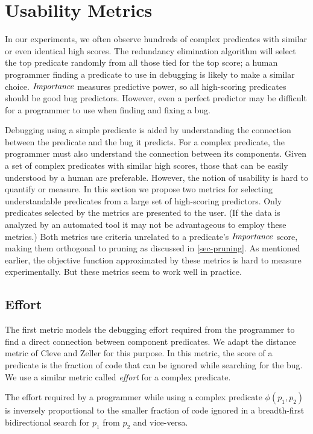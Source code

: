 
\section{Usability Metrics}
\label{sec-metrics}
In our experiments, we often observe hundreds of complex predicates with similar or even identical high scores.  The redundancy elimination algorithm will select the top predicate randomly from all those tied for the top score; a human programmer finding a predicate to use in debugging is likely to make a similar choice.  $\mathit{Importance}$ measures predictive power, so all high-scoring predicates should be good bug predictors.  However, even a perfect predictor may be difficult for a programmer to use when finding and fixing a bug.

Debugging using a simple predicate is aided by understanding the connection between the predicate and the bug it predicts.  For a complex predicate, the programmer must also understand the connection between its components.  Given a set of complex predicates with similar high scores, those that can be easily understood by a human are preferable.  However, the notion of usability is hard to quantify or measure.  In this section we propose two metrics for selecting understandable predicates from a large set of high-scoring predictors.  Only predicates selected by the metrics are presented to the user.  (If the data is analyzed by an automated tool it may not be advantageous to employ these metrics.)  Both metrics use criteria unrelated to a predicate's $\mathit{Importance}$ score, making them orthogonal to pruning as discussed in \autoref{sec-pruning}.  As mentioned earlier, the objective function approximated by these metrics is hard to measure experimentally.  But these metrics seem to work well in practice.

\subsection{Effort}

The first metric models the debugging effort required from the programmer to find a direct connection between component predicates.  We adapt the distance metric of Cleve and Zeller \cite{1062522} for this purpose.  In this metric, the score of a predicate is the fraction of code that can be ignored while searching for the bug.  We use a similar metric called \emph{effort} for a complex predicate.

\begin{defn}
\label{def-effort}
The effort required by a programmer while using a complex predicate $\phi(p_1, p_2)$ is inversely proportional to the smaller fraction of code ignored in a breadth-first bidirectional search for $p_1$ from $p_2$ and vice-versa.
\end{defn}


